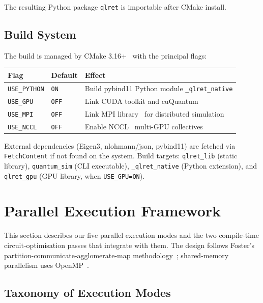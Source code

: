 \documentclass[11pt,a4paper]{article}
\begin{document}
The resulting Python package \texttt{qlret} is importable after CMake install.

\subsection{Build System}

The build is managed by CMake 3.16+~\cite{cmake} with the principal flags:

\begin{center}
\renewcommand{\arraystretch}{1.2}
\begin{tabular}{@{}lll@{}}
\toprule
\textbf{Flag} & \textbf{Default} & \textbf{Effect} \\
\midrule
\texttt{USE\_PYTHON} & \texttt{ON}  & Build pybind11 Python module \texttt{\_qlret\_native} \\
\texttt{USE\_GPU}    & \texttt{OFF} & Link CUDA toolkit and cuQuantum~\cite{bayraktar2023cuquantum} \\
\texttt{USE\_MPI}    & \texttt{OFF} & Link MPI library~\cite{gropp1999mpi} for distributed simulation \\
\texttt{USE\_NCCL}   & \texttt{OFF} & Enable NCCL~\cite{nccl} multi-GPU collectives \\
\bottomrule
\end{tabular}
\end{center}

External dependencies (Eigen3, nlohmann/json, pybind11) are fetched via
\texttt{FetchContent} if not found on the system. Build targets: \texttt{qlret\_lib}
(static library), \texttt{quantum\_sim} (CLI executable), \texttt{\_qlret\_native}
(Python extension), and \texttt{qlret\_gpu} (GPU library, when \texttt{USE\_GPU=ON}).

\section{Parallel Execution Framework}
\label{sec:parallel}

This section describes our five parallel execution modes and the two compile-time
circuit-optimisation passes that integrate with them. The design follows Foster's
partition-communicate-agglomerate-map methodology~\cite{foster1995}; shared-memory
parallelism uses OpenMP~\cite{dagummenon1998}.

\subsection{Taxonomy of Execution Modes}
\end{document}
